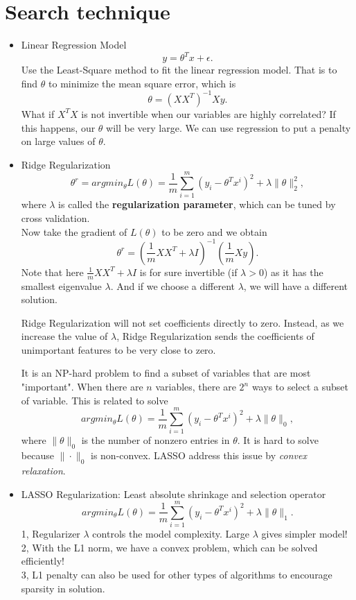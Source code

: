 \documentclass[twoside,12pt]{article}
\begin{document}
\section{Search technique}
\begin{itemize}
\item Linear Regression Model
$$y = \theta^T x + \epsilon.$$
Use the Least-Square method to fit the linear regression model. That is to find $\theta$ to minimize the mean square error, which is $$\theta = (XX^T)^{-1} Xy.$$
What if $X^TX$ is not invertible when our variables are highly correlated? If this happens, our $\theta$ will be very large. We can use regression to put a penalty on large values of $\theta$.
\item Ridge Regularization\\
$$\theta^r = argmin_\theta L(\theta) = \frac 1 m \sum_{i=1}^m (y_i - \theta^T x^i)^2 + \lambda \|\theta\|_2^2,$$
where $\lambda$ is called the \textbf{regularization parameter}, which can be tuned by cross validation. \\
Now take the gradient of $L(\theta)$ to be zero and we obtain $$ \theta^r = (\frac 1 m XX^T + \lambda I)^{-1} (\frac 1 m Xy).$$ Note that here $ \frac 1 m XX^T + \lambda I $ is for sure invertible (if $\lambda > 0$) as it has the smallest eigenvalue $\lambda$. And if we choose a different $\lambda$, we will have a different solution.

Ridge Regularization will not set coefficients directly to zero. Instead, as we increase the value of $\lambda$, Ridge Regularization sends the coefficients of unimportant features to be very close to zero. 

It is an NP-hard problem to find a subset of variables that are most "important". When there are $n$ variables, there are $2^n$ ways to select a subset of variable. This is related to solve $$argmin_\theta L(\theta) = \frac 1 m \sum_{i=1}^m (y_i - \theta^T x^i)^2 + \lambda  \|\theta\|_0,$$
where $\|\theta\|_0$ is the number of nonzero entries in $\theta$. It is hard to solve because $\|\cdot\|_0$ is non-convex. LASSO address this issue by \textit{convex relaxation}.

\item LASSO Regularization: Least absolute shrinkage and selection operator\\
$$argmin_\theta L(\theta) = \frac 1 m \sum_{i=1}^m (y_i - \theta^T x^i)^2 + \lambda  \|\theta\|_1.$$
1, Regularizer $\lambda$ controls the model complexity. Large $\lambda$ gives simpler model!\\
2, With the L1 norm, we have a convex problem, which can be solved efficiently!\\
3, L1 penalty can also be used for other types of algorithms to encourage sparsity in solution. \\


\end{itemize}
\end{document}
